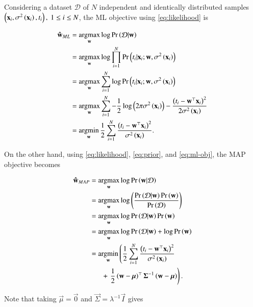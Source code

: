 \documentclass[journal,12pt,twocolumn]{IEEEtran}
\DeclareMathOperator*{\argmax}{arg\!\max}
\DeclareMathOperator*{\argmin}{arg\!\min}
\begin{document}
Considering a dataset \(\mathcal{D}\) of \(N\) independent and identically
distributed samples \(\left(\boldsymbol{\mathbf{x}}_i, \sigma^2\left(\boldsymbol{\mathbf{x}}_i\right), t_i\right),\ 1 \le i
\le N\), the ML objective using \eqref{eq:likelihood} is

\begin{align}
     \vec{\hat{w}}_{ML} &= \argmax_{\vec{w}}\log\pr{\mathcal{D}|\vec{w}} \\
                        &= \argmax_{\vec{w}}\log\prod_{i=1}^{N}\pr{t_i|\vec{x}_i;\vec{w},\sigma^2\brak{\vec{x}_i}} \\
                        &= \argmax_{\vec{w}}\sum_{i=1}^{N}\log\pr{t_i|\vec{x}_i;\vec{w},\sigma^2\brak{\vec{x}_i}} \\
                        &= \argmax_{\vec{w}}\sum_{i=1}^{N}-\frac{1}{2}\log\brak{2\pi\sigma^2\brak{\vec{x}_i}} -\frac{\brak{t_i-\vec{w}^\top\vec{x}_i}^2}{2\sigma^2\brak{\vec{x}_i}} \\
                        &= \argmin_{\vec{w}}\frac{1}{2}\sum_{i=1}^{N}\frac{\brak{t_i-\vec{w}^\top\vec{x}_i}^2}{\sigma^2\brak{\vec{x}_i}}.
                        \label{eq:ml-obj}
\end{align}

On the other hand, using \eqref{eq:likelihood}, \eqref{eq:prior}, and
\eqref{eq:ml-obj}, the MAP objective becomes

\begin{align}
     \vec{\hat{w}}_{MAP} &= \argmax_{\vec{w}}\log\pr{\vec{w}|\mathcal{D}} \\
                         &= \argmax_{\vec{w}}\log\brak{\frac{\pr{\mathcal{D}|\vec{w}}\pr{\vec{w}}}{\pr{\mathcal{D}}}} \\
                         &= \argmax_{\vec{w}}\log\pr{\mathcal{D}|\vec{w}}\pr{\vec{w}} \\
                         &= \argmax_{\vec{w}}\log\pr{\mathcal{D}|\vec{w}} + \log\pr{\vec{w}} \\
                         & \begin{multlined}
                         = \argmin_{\vec{w}}\lbrak{\frac{1}{2}\sum_{i=1}^{N}\frac{\brak{t_i-\vec{w}^\top\vec{x}_i}^2}{\sigma^2\brak{\vec{x}_i}}} \\
                         + \rbrak{\frac{1}{2}\brak{\vec{w}-\vec{\mu}}^\top\vec{\Sigma}^{-1}\brak{\vec{w}-\vec{\mu}}}.
                         \end{multlined}
                         \label{eq:map-obj}
\end{align}

Note that taking \(\vec{\mu} = \vec{0}\) and \(\vec{\Sigma} =
\lambda^{-1}\vec{I}\) gives
\end{document}
